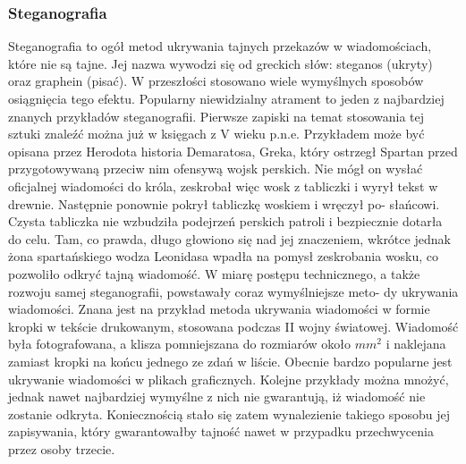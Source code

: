 \documentclass[a4paper]{article}
\begin{document}
\subsubsection{Steganografia}
Steganografia to ogół metod ukrywania tajnych przekazów w wiadomościach, które nie są tajne.
Jej nazwa wywodzi się od greckich słów: steganos (ukryty) oraz graphein (pisać). W przeszłości
stosowano wiele wymyślnych sposobów osiągnięcia tego efektu. Popularny niewidzialny atrament
to jeden z najbardziej znanych przykładów steganografii. Pierwsze zapiski na temat stosowania
tej sztuki znaleźć można już w księgach z V wieku p.n.e. Przykładem może być opisana przez
Herodota historia Demaratosa, Greka, który ostrzegł Spartan przed przygotowywaną przeciw nim
ofensywą wojsk perskich. Nie mógł on wysłać oficjalnej wiadomości do króla, zeskrobał więc wosk
z tabliczki i wyrył tekst w drewnie. Następnie ponownie pokrył tabliczkę woskiem i wręczył po-
słańcowi. Czysta tabliczka nie wzbudziła podejrzeń perskich patroli i bezpiecznie dotarła do celu.
Tam, co prawda, długo głowiono się nad jej znaczeniem, wkrótce jednak żona spartańskiego wodza
Leonidasa wpadła na pomysł zeskrobania wosku, co pozwoliło odkryć tajną wiadomość. W miarę
postępu technicznego, a także rozwoju samej steganografii, powstawały coraz wymyślniejsze meto-
dy ukrywania wiadomości. Znana jest na przykład metoda ukrywania wiadomości w formie kropki
w tekście drukowanym, stosowana podczas II wojny światowej. Wiadomość była fotografowana,
a klisza pomniejszana do rozmiarów około $mm^2$ i naklejana zamiast kropki na końcu jednego ze
zdań w liście. Obecnie bardzo popularne jest ukrywanie wiadomości w plikach graficznych. Kolejne
przykłady można mnożyć, jednak nawet najbardziej wymyślne z nich nie gwarantują, iż wiadomość
nie zostanie odkryta. Koniecznością stało się zatem wynalezienie takiego sposobu jej zapisywania,
który gwarantowałby tajność nawet w przypadku przechwycenia przez osoby trzecie.
\end{document}
